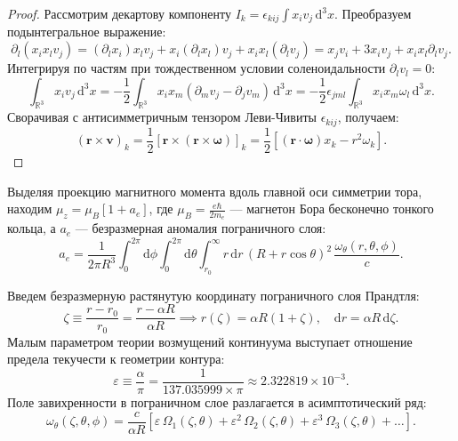 \documentclass[11pt,a4paper]{article}
\theoremstyle{definition}
\theoremstyle{remark}
\begin{document}
\begin{proof}
Рассмотрим декартову компоненту $I_k = \epsilon_{kij} \int x_i v_j \, \mathrm{d}^3 x$. Преобразуем подынтегральное выражение:
\begin{equation}
    \partial_l (x_i x_l v_j) = (\partial_l x_i) x_l v_j + x_i (\partial_l x_l) v_j + x_i x_l (\partial_l v_j) = x_j v_i + 3 x_i v_j + x_i x_l \partial_l v_j.
\end{equation}
Интегрируя по частям при тождественном условии соленоидальности $\partial_l v_l = 0$:
\begin{equation}
    \int_{\mathbb{R}^3} x_i v_j \, \mathrm{d}^3 x = -\frac{1}{2} \int_{\mathbb{R}^3} x_i x_m (\partial_m v_j - \partial_j v_m) \, \mathrm{d}^3 x = -\frac{1}{2} \epsilon_{jml} \int_{\mathbb{R}^3} x_i x_m \omega_l \, \mathrm{d}^3 x.
\end{equation}
Сворачивая с антисимметричным тензором Леви-Чивиты $\epsilon_{kij}$, получаем:
\begin{equation}
    (\mathbf{r} \times \mathbf{v})_k = \frac{1}{2} \left[ \mathbf{r} \times (\mathbf{r} \times \boldsymbol{\omega}) \right]_k = \frac{1}{2} \left[ (\mathbf{r} \cdot \boldsymbol{\omega}) x_k - r^2 \omega_k \right].
\end{equation}
\end{proof}

Выделяя проекцию магнитного момента вдоль главной оси симметрии тора, находим $\mu_z = \mu_B [1 + a_e]$, где $\mu_B = \frac{e\hbar}{2m_e}$ --- магнетон Бора бесконечно тонкого кольца, а $a_e$ --- безразмерная аномалия пограничного слоя:
\begin{equation}
    a_e = \frac{1}{2\pi R^3} \int_0^{2\pi} \mathrm{d}\phi \int_0^{2\pi} \mathrm{d}\theta \int_{r_0}^\infty r \, \mathrm{d}r \, (R + r \cos\theta)^2 \, \frac{\omega_\theta(r, \theta, \phi)}{c}.
    \label{eq:master_anomaly_integral}
\end{equation}

Введем безразмерную растянутую координату пограничного слоя Прандтля:
\begin{equation}
    \zeta \equiv \frac{r - r_0}{r_0} = \frac{r - \alpha R}{\alpha R} \implies r(\zeta) = \alpha R(1 + \zeta), \quad \mathrm{d}r = \alpha R \, \mathrm{d}\zeta.
\end{equation}
Малым параметром теории возмущений континуума выступает отношение предела текучести к геометрии контура:
\begin{equation}
    \varepsilon \equiv \frac{\alpha}{\pi} = \frac{1}{137.035999 \times \pi} \approx 2.322819 \times 10^{-3}.
\end{equation}
Поле завихренности в пограничном слое разлагается в асимптотический ряд:
\begin{equation}
    \omega_\theta(\zeta, \theta, \phi) = \frac{c}{\alpha R} \left[ \varepsilon \, \Omega_1(\zeta, \theta) + \varepsilon^2 \, \Omega_2(\zeta, \theta) + \varepsilon^3 \, \Omega_3(\zeta, \theta) + \dots \right].
    \label{eq:prandtl_series}
\end{equation}
\end{document}
